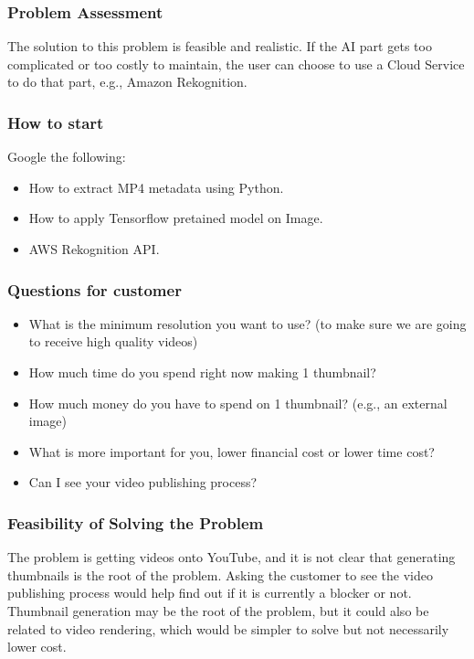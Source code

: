 \documentclass{article}
\begin{document}
\subsubsection{Problem Assessment}

The solution to this problem is feasible and realistic. If the AI part gets too complicated or too costly to maintain, the user can choose to use a Cloud Service to do that part, e.g., Amazon Rekognition.

\subsubsection{How to start}

Google the following:

\begin{itemize}
  \item How to extract MP4 metadata using Python.
  \item How to apply Tensorflow pretained model on Image.
  \item AWS Rekognition API. 
\end{itemize}

\subsubsection{Questions for customer}

\begin{itemize}
  \item What is the minimum resolution you want to use? (to make sure we are going to receive high quality videos)
  \item How much time do you spend right now making 1 thumbnail?
  \item How much money do you have to spend on 1 thumbnail? (e.g., an external image)
  \item What is more important for you, lower financial cost or lower time cost?
  \item Can I see your video publishing process?
\end{itemize}

\subsubsection{Feasibility of Solving the Problem}

The problem is getting videos onto YouTube, and it is not clear that generating thumbnails is the root of the problem. Asking the customer to see the video publishing process would help find out if it is currently a blocker or not. Thumbnail generation may be the root of the problem, but it could also be related to video rendering, which would be simpler to solve but not necessarily lower cost. 
\end{document}
